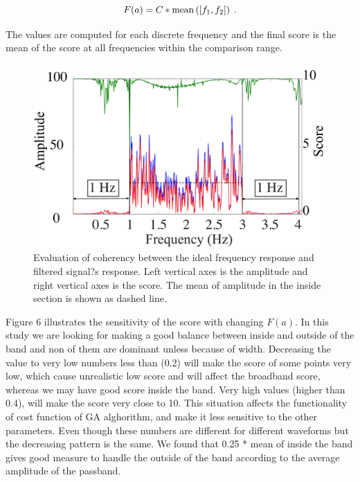 \documentclass{article}
\begin{document}
% 
\begin{equation}
    F(a) = C *  \mathrm{mean} \left( [f_1,f_2] \right)
    \hspace{0.25em}.
\end{equation}
% 

The values are computed for each discrete frequency and the final score is the mean of  the score at all frequencies within the comparison range.  

\begin{figure} [H]
\begin{center}  
\includegraphics[scale=0.3]{figures/pdf/figure5.pdf} 
\caption{Evaluation of coherency between the ideal frequency response and filtered signal?s response. Left vertical axes is the amplitude and right vertical axes is the score. The mean of amplitude in the inside section is shown as dashed line.}
\end{center}   
\end{figure}


Figure 6 illustrates the sensitivity of the score with changing $F(a)$. In this study we are looking for making a good balance between inside and outside of the band and non of them are dominant unless because of width. Decreasing the value to very low numbers less than (0.2) will make the score of some points very low, which cause unrealistic low score and will affect the broadband score, whereas  we may have good score inside the band. Very high values (higher than 0.4), will make the score very close to 10. This situation affects the functionality of  cost function of GA alghorithm, and make it less sensitive to the other parameters. Even though these numbers are different for different waveforms but the decreasing pattern is the same. We found that 0.25 * mean of inside the band gives good measure to handle the outside of the band according to the average amplitude of the passband.
\end{document}
